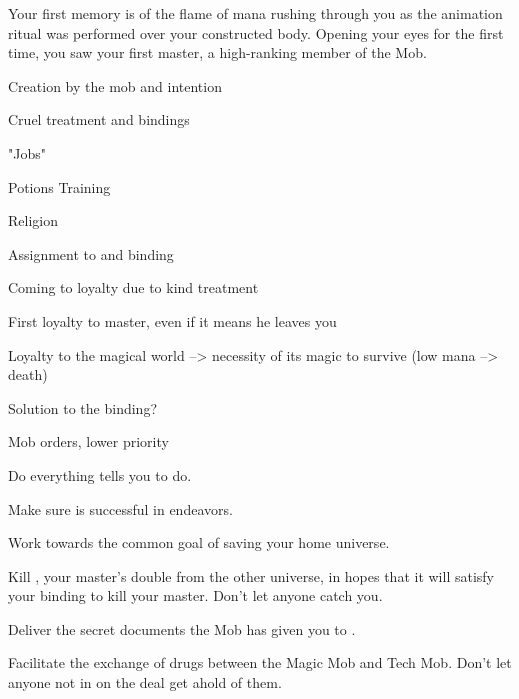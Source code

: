 \documentclass[char]{guildcamp3}
\begin{document}
\name{\cServant{}}



Your first memory is of the flame of mana rushing through you as the animation ritual was performed over your constructed body. Opening your eyes for the first time, you saw your first master, a high-ranking member of the Mob.

Creation by the mob and intention

Cruel treatment and bindings

"Jobs"

Potions Training

Religion

Assignment to \cNobleOne{} and binding

Coming to loyalty due to kind treatment

First loyalty to master, even if it means he leaves you

Loyalty to the magical world --> necessity of its magic to survive
(low mana --> death)

Solution to the binding?

Mob orders, lower priority

\begin{itemz}[Goals]
  \item Do everything \cNobleOne{} tells you to do.
  \item Make sure \cNobleOne{} is successful in \cNobleOne{\their} endeavors.
  \item Work towards the common goal of saving your home universe.
  \item Kill \cPoliOne{}, your master's double from the other universe, in hopes that it will satisfy your binding to kill your master. Don't let anyone catch you.
  \item Deliver the secret documents the Mob has given you to \cSpecOpTwo{}.
  \item Facilitate the exchange of drugs between the Magic Mob and Tech Mob. Don't let anyone not in on the deal get ahold of them.
\end{itemz}
\end{document}

